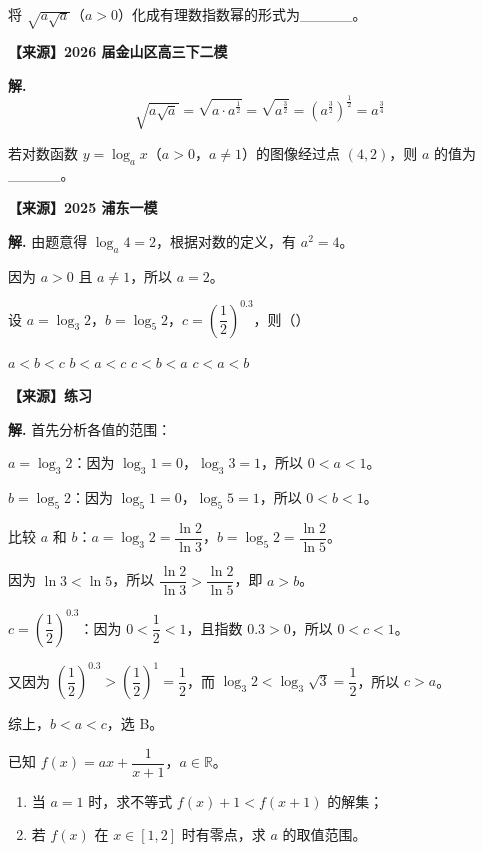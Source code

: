\documentclass[11pt]{ctexrep}
\begin{document}
\begin{example}[指数式化简]
    将 $\sqrt{a\sqrt{a}}$（$a > 0$）化成有理数指数幂的形式为\_\_\_\_\_。
    
    \textbf{【来源】2026 届金山区高三下二模}
\end{example}

\textbf{解.} 
\[
    \sqrt{a\sqrt{a}} = \sqrt{a \cdot a^{\frac{1}{2}}} = \sqrt{a^{\frac{3}{2}}} = \left(a^{\frac{3}{2}}\right)^{\frac{1}{2}} = a^{\frac{3}{4}}
\]

\begin{example}[对数函数求值]
    若对数函数 $y = \log_a x$（$a > 0$，$a \neq 1$）的图像经过点 $(4, 2)$，则 $a$ 的值为\_\_\_\_\_。
    
    \textbf{【来源】2025 浦东一模}
\end{example}

\textbf{解.} 由题意得 $\log_a 4 = 2$，根据对数的定义，有 $a^2 = 4$。

因为 $a > 0$ 且 $a \neq 1$，所以 $a = 2$。

\begin{example}[指对数比较大小]
    设 $a = \log_3 2$，$b = \log_5 2$，$c = \left(\dfrac{1}{2}\right)^{0.3}$，则（\quad）

     $a < b < c$ \quad {} $b < a < c$ \quad {} $c < b < a$ \quad {} $c < a < b$
    
    \textbf{【来源】练习}
\end{example}

\textbf{解.} 首先分析各值的范围：

$a = \log_3 2$：因为 $\log_3 1 = 0$，$\log_3 3 = 1$，所以 $0 < a < 1$。

$b = \log_5 2$：因为 $\log_5 1 = 0$，$\log_5 5 = 1$，所以 $0 < b < 1$。

比较 $a$ 和 $b$：$a = \log_3 2 = \dfrac{\ln 2}{\ln 3}$，$b = \log_5 2 = \dfrac{\ln 2}{\ln 5}$。

因为 $\ln 3 < \ln 5$，所以 $\dfrac{\ln 2}{\ln 3} > \dfrac{\ln 2}{\ln 5}$，即 $a > b$。

$c = \left(\dfrac{1}{2}\right)^{0.3}$：因为 $0 < \dfrac{1}{2} < 1$，且指数 $0.3 > 0$，所以 $0 < c < 1$。

又因为 $\left(\dfrac{1}{2}\right)^{0.3} > \left(\dfrac{1}{2}\right)^1 = \dfrac{1}{2}$，而 $\log_3 2 < \log_3 \sqrt{3} = \dfrac{1}{2}$，所以 $c > a$。

综上，$b < a < c$，选 B。

\begin{realexam}[2019 上海秋考]
    已知 $f(x) = ax + \dfrac{1}{x+1}$，$a \in \mathbb{R}$。
    \begin{enumerate}
        \item 当 $a = 1$ 时，求不等式 $f(x) + 1 < f(x+1)$ 的解集；
        \item 若 $f(x)$ 在 $x \in [1, 2]$ 时有零点，求 $a$ 的取值范围。
    \end{enumerate}
\end{realexam}
\end{document}
